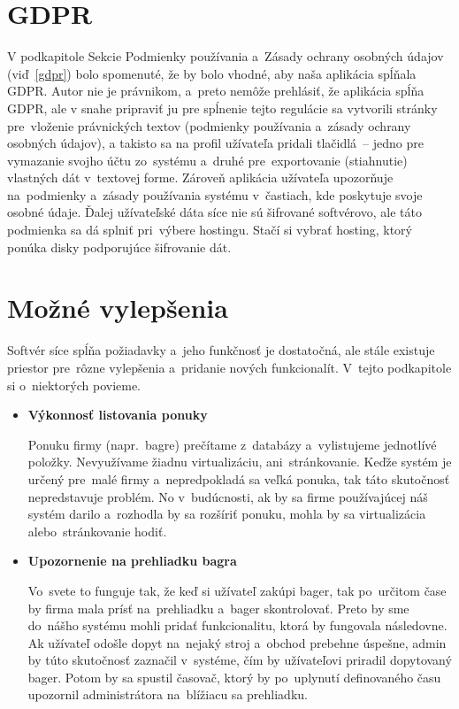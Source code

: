 \section{GDPR}

V podkapitole Sekcie Podmienky používania a~Zásady ochrany osobných údajov (viď~\ref{gdpr}) bolo spomenuté, že by bolo vhodné, aby naša aplikácia spĺňala GDPR. Autor nie je právnikom, a~preto nemôže prehlásiť, že aplikácia spĺňa GDPR, ale v snahe pripraviť ju pre spĺnenie tejto regulácie sa vytvorili stránky pre~vloženie právnických textov (podmienky používania a~zásady ochrany osobných údajov), a takisto sa na profil užívateľa pridali tlačidlá~-- jedno pre vymazanie svojho účtu zo~systému a~druhé pre~exportovanie (stiahnutie) vlastných dát v~textovej forme. Zároveň aplikácia užívateľa upozorňuje na~podmienky a~zásady používania systému v~častiach, kde poskytuje svoje osobné údaje. Ďalej užívateľské dáta síce nie sú šifrované softvérovo, ale táto podmienka sa dá splniť pri~výbere hostingu. Stačí si vybrať hosting, ktorý ponúka disky podporujúce šifrovanie dát.

\section{Možné vylepšenia}

Softvér síce spĺňa požiadavky a~jeho funkčnosť je dostatočná, ale stále existuje priestor pre~rôzne vylepšenia a~pridanie nových funkcionalít. V~tejto podkapitole si o~niektorých povieme.

\begin{itemize}
\item \textbf{Výkonnosť listovania ponuky}

Ponuku firmy (napr.~bagre) prečítame z~databázy a~vylistujeme jednotlívé položky. Nevyužívame žiadnu virtualizáciu, ani~stránkovanie. Keďže systém je určený pre~malé firmy a~nepredpokladá sa veľká ponuka, tak táto skutočnosť nepredstavuje problém. No v~budúcnosti, ak by sa firme používajúcej náš systém darilo a~rozhodla by sa rozšíriť ponuku, mohla by sa virtualizácia alebo~stránkovanie hodiť.

\item \textbf{Upozornenie na prehliadku bagra}

Vo~svete to funguje tak, že keď si užívateľ zakúpi bager, tak po~určitom čase by firma mala prísť na~prehliadku a~bager skontrolovať. Preto by sme do~nášho systému mohli pridať funkcionalitu, ktorá by fungovala následovne. Ak užívateľ odošle dopyt na~nejaký stroj a~obchod prebehne úspešne, admin by túto skutočnosť zaznačil v~systéme, čím by užívateľovi priradil dopytovaný bager. Potom by sa spustil časovač, ktorý by po~uplynutí definovaného času upozornil administrátora na~blížiacu sa prehliadku.
\end{itemize}
